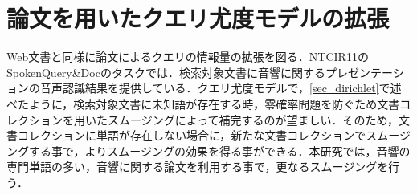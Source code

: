 




\section{論文を用いたクエリ尤度モデルの拡張}
Web文書と同様に論文によるクエリの情報量の拡張を図る．NTCIR11のSpokenQuery\&Docのタスクでは．検索対象文書に音響に関するプレゼンテーションの音声認識結果を提供している．クエリ尤度モデルで，\ref{sec_dirichlet}で述べたように，検索対象文書に未知語が存在する時，零確率問題を防ぐため文書コレクションを用いたスムージングによって補完するのが望ましい．そのため，文書コレクションに単語が存在しない場合に，新たな文書コレクションでスムージングする事で，よりスムージングの効果を得る事ができる．本研究では，音響の専門単語の多い，音響に関する論文を利用する事で，更なるスムージングを行う． 

